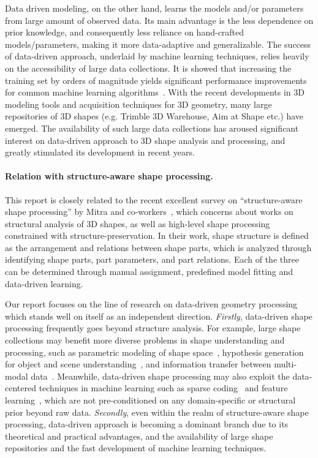 Data driven modeling, on the other hand, learns the models and/or parameters from large amount of observed data.
Its main advantage is the less dependence on prior knowledge, and consequently less reliance on hand-crafted models/parameters, making it more data-adaptive and generalizable.
The success of data-driven approach, underlaid by machine learning techniques, relies heavily on the accessibility of large data collections.
It is showed that increasing the training set by orders of magnitude yields significant performance improvements for common machine learning algorithms~\cite{Banko:2001:MPA}.
With the recent developments in 3D modeling tools and acquisition techniques for 3D geometry,
many large repositories of 3D shapes (e.g. Trimble 3D Warehouse, Aim at Shape etc.) have emerged.
The availability of such large data collections has aroused significant interest on
data-driven approach to 3D shape analysis and processing, and greatly stimulated its development in recent years.


\paragraph*{Relation with structure-aware shape processing.}
This report is closely related to the recent excellent survey on ``structure-aware shape processing'' by Mitra and co-workers~\cite{Mitra:2014:SASP},
which concerns about works on structural analysis of 3D shapes, as well as high-level shape processing constrained with structure-preservation.
In their work, shape structure is defined as the arrangement and relations between shape parts,
which is analyzed through identifying shape parts, part parameters, and part relations.
Each of the three can be determined through manual assignment, predefined model fitting and data-driven learning.

Our report focuses on the line of research on data-driven geometry processing which stands well on itself as an independent direction.
\emph{Firstly}, data-driven shape processing frequently goes beyond structure analysis.
For example, large shape collections may benefit more diverse problems in shape understanding and processing,
such as parametric modeling of shape space~\cite{Allen:2003:SHB,Kalogerakis:2009:DDC},
hypothesis generation for object and scene understanding~\cite{Zia:2013:DR,Satkin:2012:DDS},
and information transfer between multi-modal data~\cite{Wang:2013:PAS,Su:2014:EID}.
Meanwhile, data-driven shape processing may also exploit the data-centered techniques in machine learning
such as sparse coding~\cite{Ren:2013:HSC} and feature learning~\cite{Lai:2013:UFL},
which are not pre-conditioned on any domain-specific or structural prior beyond raw data.
%
\emph{Secondly}, even within the realm of structure-aware shape processing, data-driven approach is becoming a dominant branch due
to its theoretical and practical advantages, and the availability of large shape repositories and the fast development of machine learning techniques.

